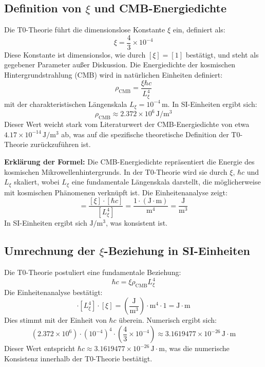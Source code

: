 \documentclass{article}
\begin{document}
	\subsection{Definition von $\xi$ und CMB-Energiedichte}
	Die T0-Theorie führt die dimensionslose Konstante $\xi$ ein, definiert als:
	\begin{equation}
		\xi = \frac{4}{3} \times 10^{-4}
	\end{equation}
	Diese Konstante ist dimensionslos, wie durch $[ \xi ] = [1]$ bestätigt, und steht als gegebener Parameter außer Diskussion. Die Energiedichte der kosmischen Hintergrundstrahlung (CMB) wird in natürlichen Einheiten definiert:
	\begin{equation}
		\rho_{\text{CMB}} = \frac{\xi \hbar c}{L_\xi^4}
	\end{equation}
	mit der charakteristischen Längenskala $L_\xi = 10^{-4} \, \text{m}$. In SI-Einheiten ergibt sich:
	\begin{equation}
		\rho_{\text{CMB}} \approx 2.372 \times 10^6 \, \text{J}/\text{m}^3
	\end{equation}
	Dieser Wert weicht stark vom Literaturwert der CMB-Energiedichte von etwa $4.17 \times 10^{-14} \, \text{J}/\text{m}^3$ ab, was auf die spezifische theoretische Definition der T0-Theorie zurückzuführen ist.
	
	\textbf{Erklärung der Formel:} Die CMB-Energiedichte repräsentiert die Energie des kosmischen Mikrowellenhintergrunds. In der T0-Theorie wird sie durch $\xi$, $\hbar c$ und $L_\xi$ skaliert, wobei $L_\xi$ eine fundamentale Längenskala darstellt, die möglicherweise mit kosmischen Phänomenen verknüpft ist. Die Einheitenanalyse zeigt:
	\begin{equation}
		[\rho_{\text{CMB}}] = \frac{[\xi] \cdot [\hbar c]}{[L_\xi^4]} = \frac{1 \cdot (\text{J} \cdot \text{m})}{\text{m}^4} = \frac{\text{J}}{\text{m}^3}
	\end{equation}
	In SI-Einheiten ergibt sich $\text{J}/\text{m}^3$, was konsistent ist.
	
	\subsection{Umrechnung der $\xi$-Beziehung in SI-Einheiten}
	Die T0-Theorie postuliert eine fundamentale Beziehung:
	\begin{equation}
		\hbar c = \xi \rho_{\text{CMB}} L_\xi^4
	\end{equation}
	Die Einheitenanalyse bestätigt:
	\begin{equation}
		[\rho_{\text{CMB}}] \cdot [L_\xi^4] \cdot [\xi] = \left( \frac{\text{J}}{\text{m}^3} \right) \cdot \text{m}^4 \cdot 1 = \text{J} \cdot \text{m}
	\end{equation}
	Dies stimmt mit der Einheit von $\hbar c$ überein. Numerisch ergibt sich:
	\begin{equation}
		\left( 2.372 \times 10^6 \right) \cdot \left( 10^{-4} \right)^4 \cdot \left( \frac{4}{3} \times 10^{-4} \right) \approx 3.1619477 \times 10^{-26} \, \text{J} \cdot \text{m}
	\end{equation}
	Dieser Wert entspricht $\hbar c \approx 3.1619477 \times 10^{-26} \, \text{J} \cdot \text{m}$, was die numerische Konsistenz innerhalb der T0-Theorie bestätigt.
	
\end{document}
